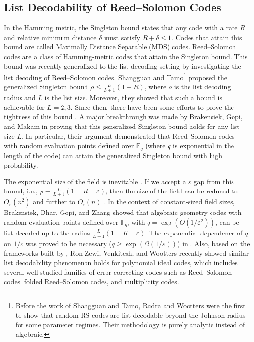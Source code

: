 \documentclass[11pt]{article}
\theoremstyle{plain}
\theoremstyle{definition}
\theoremstyle{remark}
\newcommand{\F}{\mathbb{F}}
\renewcommand{\epsilon}{\varepsilon}
\begin{document}
\subsection{List Decodability of Reed--Solomon Codes}
In the Hamming metric, the Singleton bound \cite{Sin64} states that any code with a rate $R$ and relative minimum distance $\delta$ must satisfy $R + \delta \leq 1$. Codes that attain this bound are called Maximally Distance Separable (MDS) codes. Reed--Solomon codes are a class of Hamming-metric codes that attain the Singleton bound. This bound was recently generalized to the list decoding setting by investigating the list decoding of Reed--Solomon codes. Shangguan and Tamo\footnote{Before the work of Shangguan and Tamo, Rudra and Wootters \cite{rudra2014every} were the first to show that random RS codes are list decodable beyond the Johnson radius for some parameter regimes. Their methodology is purely analytic instead of algebraic.} \cite{shangguan2020combinatorial} proposed the generalized Singleton bound $\rho \leq \frac{L}{L+1}(1-R)$, where $\rho$ is the list decoding radius and $L$ is the list size. Moreover, they showed that such a bound is achievable for $L=2,3$. Since then, there have been some efforts to prove the tightness of this bound \cite{GSTW21,FKS22,GST23}. A major breakthrough was made by Brakensiek, Gopi, and Makam \cite{brakensiek2023generic} in proving that this generalized Singleton bound holds for any list size $L$. In particular, their argument demonstrated that Reed--Solomon codes with random evaluation points defined over $\F_q$ (where $q$ is exponential in the length of the code) can attain the generalized Singleton bound with high probability. 

The exponential size of the field is inevitable \cite{brakensiek2022lower}. If we accept a $\epsilon$ gap from this bound, i.e., $\rho = \frac{L}{L+1}(1-R-\epsilon)$, then the size of the field can be reduced to $O_{\epsilon}(n^2)$ \cite{guo2023randomly} and further to $O_{\epsilon}(n)$ \cite{alrabiah2023randomly}. In the context of constant-sized field sizes, Brakensiek, Dhar, Gopi, and Zhang \cite{brakensiek2023ag} showed that algebraic geometry codes with random evaluation points defined over $\F_q$, with $q = \exp(O(1/\epsilon^2))$, can be list decoded up to the radius $\frac{L}{L+1}(1-R-\epsilon)$. The exponential dependence of $q$ on $1/\epsilon$ was proved to be necessary ($q \geq \exp(\Omega(1/\epsilon))$) in \cite{alrabiah2023ag}. Also, based on the frameworks built by \cite{brakensiek2023generic,guo2023randomly,alrabiah2023randomly}, Ron-Zewi, Venkitesh, and Wootters \cite{ron2024efficient} recently showed similar list decodability phenomenon holds for polynomial ideal codes, which includes several well-studied families of error-correcting codes such as Reed--Solomon codes, folded Reed--Solomon codes, and multiplicity codes.
\end{document}
